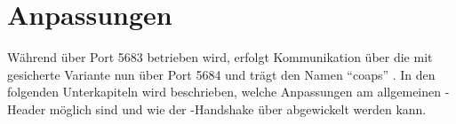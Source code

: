 \chapter{Anpassungen}

Während  über Port 5683 betrieben wird, erfolgt Kommunikation über die mit  gesicherte Variante nun
über Port 5684 und trägt den Namen "`coaps"' \cite{portnumbers}. In den folgenden Unterkapiteln wird beschrieben, welche
Anpassungen am allgemeinen -Header möglich sind und wie der -Handshake über  abgewickelt
werden kann.



